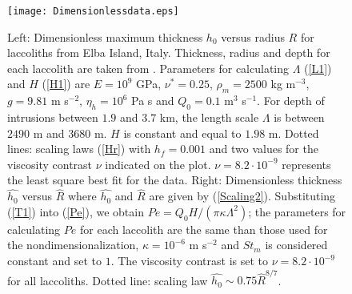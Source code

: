 \begin{figure}
  \begin{center}
    \graphicspath{ {/Users/thorey/Documents/These/Projet/Refroidissement/Skin_Model/Figure/JFM_V13/} }
    \texttt{[image: Dimensionlessdata.eps]}
    \caption{Left: Dimensionless maximum thickness $h_0$ versus radius
      $R$ for  laccoliths from Elba Island,  Italy.  Thickness, radius
      and    depth    for    each    laccolith    are    taken    from
      \citet{Rocchi:2002jy}.   Parameters  for  calculating  $\Lambda$
      (\ref{L1}) and  $H$ (\ref{H1})  are $E=10^9$  GPa, $\nu^*=0.25$,
      $\rho_m = 2500$ kg m$^{-3}$, $g=9.81$ m s$^{-2}$, $\eta_h =10^6$
      Pa s  and $Q_0 =  0.1$ m$^3$  s$^{-1}$. For depth  of intrusions
      between  $1.9$  and $3.7$  km,  the  length scale  $\Lambda$  is
      between $2490$  m and $3680$  m.  $H$  is constant and  equal to
      $1.98$   m.   Dotted   lines:  scaling   laws  (\ref{Hr})   with
      $h_f =  0.001$ and two  values for the viscosity  contrast $\nu$
      indicated on the  plot. $\nu = 8.2\cdot  10^{-9}$ represents the
      least  square  best  fit  for the  data.   Right:  Dimensionless
      thickness  $\hat{h_0}$ versus  $\hat{R}$  where $\hat{h_0}$  and
      $\hat{R}$   are   given   by   (\ref{Scaling2}).    Substituting
      (\ref{T1})        into        (\ref{Pe}),       we        obtain
      $Pe  =  Q_0  H  /(\pi \kappa  \Lambda^2)$;  the  parameters  for
      calculating $Pe$ for each laccolith are the same than those used
      for the  nondimensionalization, $\kappa=10^{-6}$ m  s$^{-2}$ and
      $St_m$ is  considered constant  and set  to $1$.   The viscosity
      contrast is set  to $\nu =8.2\cdot 10^{-9}$  for all laccoliths.
      Dotted line: scaling law $ \hat{h_0} \sim 0.75\hat{R}^{8/7}$.}
    \label{Data}
  \end{center}
\end{figure}

